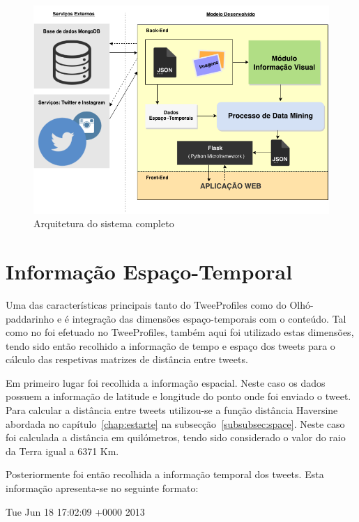 \begin{figure}[h]
\centering
\includegraphics[width=1.0\linewidth]{./figures/arquitetura_sistema}
\caption{Arquitetura do sistema completo}
\label{fig:archsys}
\end{figure}


\section{Informação Espaço-Temporal} \label{sec:infoesptmp}

Uma das características principais tanto do TweeProfiles como do Olhó-paddarinho e é integração das dimensões espaço-temporais com o conteúdo. Tal como no foi efetuado no TweeProfiles, também aqui foi utilizado estas dimensões, tendo sido então recolhido a informação de tempo e espaço dos tweets para o cálculo das respetivas matrizes de distância entre tweets.

Em primeiro lugar foi recolhida a informação espacial. Neste caso os dados possuem a informação de latitude e longitude do ponto onde foi enviado o tweet. Para calcular a distância entre tweets utilizou-se a função distância Haversine abordada no capítulo~\ref{chap:estarte} na subsecção~\ref{subsubsec:space}. Neste caso foi calculada a distância em quilómetros, tendo sido considerado o valor do raio da Terra igual a 6371 Km.

Posteriormente foi então recolhida a informação temporal dos tweets. Esta informação apresenta-se no seguinte formato:

\vspace{2mm}
Tue Jun 18 17:02:09 +0000 2013
\vspace{2mm}

